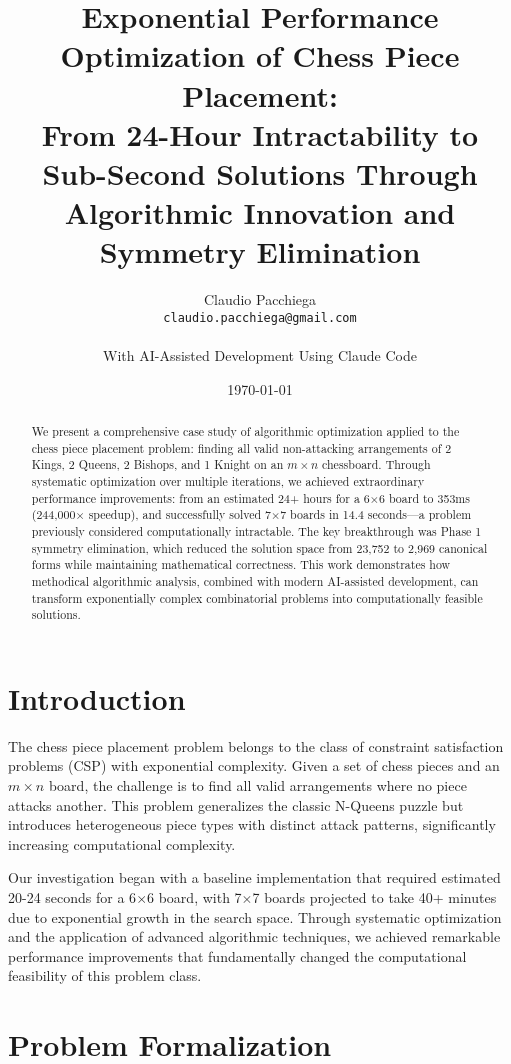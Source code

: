 \documentclass[12pt,a4paper]{article}
\title{Exponential Performance Optimization of Chess Piece Placement:\\
From 24-Hour Intractability to Sub-Second Solutions Through\\
Algorithmic Innovation and Symmetry Elimination}
\author{Claudio Pacchiega\\
\texttt{claudio.pacchiega@gmail.com}\\
\\
\small{With AI-Assisted Development Using Claude Code}}
\date{\today}
\theoremstyle{definition}
\begin{document}
\maketitle

\begin{abstract}
We present a comprehensive case study of algorithmic optimization applied to the chess piece placement problem: finding all valid non-attacking arrangements of 2 Kings, 2 Queens, 2 Bishops, and 1 Knight on an $m \times n$ chessboard. Through systematic optimization over multiple iterations, we achieved extraordinary performance improvements: from an estimated 24+ hours for a 6$\times$6 board to 353ms (244,000$\times$ speedup), and successfully solved 7$\times$7 boards in 14.4 seconds—a problem previously considered computationally intractable. The key breakthrough was Phase 1 symmetry elimination, which reduced the solution space from 23,752 to 2,969 canonical forms while maintaining mathematical correctness. This work demonstrates how methodical algorithmic analysis, combined with modern AI-assisted development, can transform exponentially complex combinatorial problems into computationally feasible solutions.
\end{abstract}

\section{Introduction}

The chess piece placement problem belongs to the class of constraint satisfaction problems (CSP) with exponential complexity. Given a set of chess pieces and an $m \times n$ board, the challenge is to find all valid arrangements where no piece attacks another. This problem generalizes the classic N-Queens puzzle but introduces heterogeneous piece types with distinct attack patterns, significantly increasing computational complexity.

Our investigation began with a baseline implementation that required estimated 20-24 seconds for a 6$\times$6 board, with 7$\times$7 boards projected to take 40+ minutes due to exponential growth in the search space. Through systematic optimization and the application of advanced algorithmic techniques, we achieved remarkable performance improvements that fundamentally changed the computational feasibility of this problem class.

\section{Problem Formalization}
\end{document}
